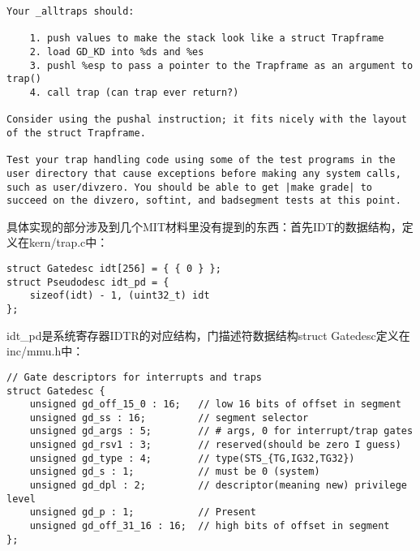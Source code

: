 \documentclass{article}
\begin{document}
\begin{CJK*}{UTF8}{gkai}
\begin{lstlisting}[style=exercise]
Your _alltraps should:

    1. push values to make the stack look like a struct Trapframe
    2. load GD_KD into %ds and %es
    3. pushl %esp to pass a pointer to the Trapframe as an argument to trap()
    4. call trap (can trap ever return?)

Consider using the pushal instruction; it fits nicely with the layout of the struct Trapframe.

Test your trap handling code using some of the test programs in the user directory that cause exceptions before making any system calls, such as user/divzero. You should be able to get |make grade| to succeed on the divzero, softint, and badsegment tests at this point.
\end{lstlisting}


具体实现的部分涉及到几个MIT材料里没有提到的东西：首先IDT的数据结构，定义在kern/trap.c中：

\begin{lstlisting}[style=ccode, title={\scriptsize \ttfamily \bfseries kern/trap.c}]
struct Gatedesc idt[256] = { { 0 } };
struct Pseudodesc idt_pd = {
	sizeof(idt) - 1, (uint32_t) idt
};
\end{lstlisting}

idt\_pd是系统寄存器IDTR的对应结构，门描述符数据结构struct Gatedesc定义在inc/mmu.h中：

\begin{lstlisting}[style=ccode, firstnumber=257, title={\scriptsize \ttfamily \bfseries inc/mmu.h}]
// Gate descriptors for interrupts and traps
struct Gatedesc {
	unsigned gd_off_15_0 : 16;   // low 16 bits of offset in segment
	unsigned gd_ss : 16;         // segment selector
	unsigned gd_args : 5;        // # args, 0 for interrupt/trap gates
	unsigned gd_rsv1 : 3;        // reserved(should be zero I guess)
	unsigned gd_type : 4;        // type(STS_{TG,IG32,TG32})
	unsigned gd_s : 1;           // must be 0 (system)
	unsigned gd_dpl : 2;         // descriptor(meaning new) privilege level
	unsigned gd_p : 1;           // Present
	unsigned gd_off_31_16 : 16;  // high bits of offset in segment
};


\end{lstlisting}
\end{CJK*}
\end{document}
